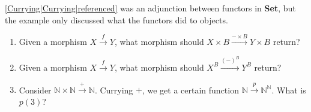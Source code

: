 
\ref{Currying|Currying|referenced} was an adjunction between functors in \textbf{Set}, but the example only discussed what the functors did to objects.
    \begin{enumerate}
      \item Given a morphism $X \xrightarrow{f}Y$, what morphism should $X \times B \xrightarrow{-\times B}Y\times B$ return?
      \item Given a morphism $X \xrightarrow{f}Y$, what morphism should $X^ B \xrightarrow{(-)^B}Y^B$ return?
      \item Consider $\mathbb{N}\times \mathbb{N}\xrightarrow{+}\mathbb{N}$. Currying $+$, we get a certain function $\mathbb{N}\xrightarrow{p}\mathbb{N}^\mathbb{N}$. What is $p(3)$?
    \end{enumerate}
